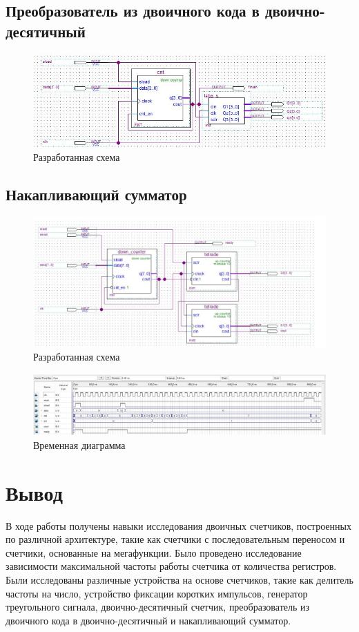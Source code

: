 \documentclass[a4paper,12pt]{article}
\begin{document}
    \subsection{Преобразователь из двоичного кода в двоично-десятичный}
    \begin{figure}[H]
        \centering
        \includegraphics[width=\linewidth]{scheme_6}
        \caption{Разработанная схема}
    \end{figure}
    \subsection{Накапливающий сумматор}
    \begin{figure}[H]
        \centering
        \includegraphics[width=\linewidth]{scheme_last}
        \caption{Разработанная схема}
    \end{figure}
    \begin{figure}[H]
        \centering
        \includegraphics[width=\linewidth]{wave_last}
        \caption{Временная диаграмма}
    \end{figure}
    \section{Вывод}
    В ходе работы получены навыки исследования двоичных счетчиков, построенных по различной архитектуре,
    такие как счетчики с последовательным переносом и счетчики, основанные на мегафункции. Было проведено
    исследование зависимости максимальной частоты работы счетчика от количества регистров. Были исследованы
    различные устройства на основе счетчиков, такие как делитель частоты на число, устройство фиксации коротких
    импульсов, генератор треугольного сигнала, двоично-десятичный счетчик, преобразователь из двоичного кода в
    двоично-десятичный и накапливающий сумматор.
\end{document}
